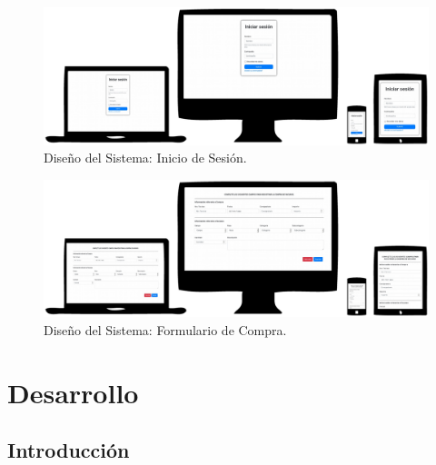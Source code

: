 \documentclass[11pt,oneside]{book}
\begin{document}
\begin{figure}[tbhp]
\centerline{\includegraphics[scale=0.7]{figs/capitulo_3_disenio/loginForm.pdf}}
\caption{Diseño del Sistema: Inicio de Sesión.}
\label{fig204}
\end{figure}

\begin{figure}[tbhp]
\centerline{\includegraphics[scale=0.7]{figs/capitulo_3_disenio/compraForm.pdf}}
\caption{Diseño del Sistema: Formulario de Compra.}
\label{fig205}
\end{figure}

\chapter{Desarrollo}

\section{Introducción}
\end{document}
